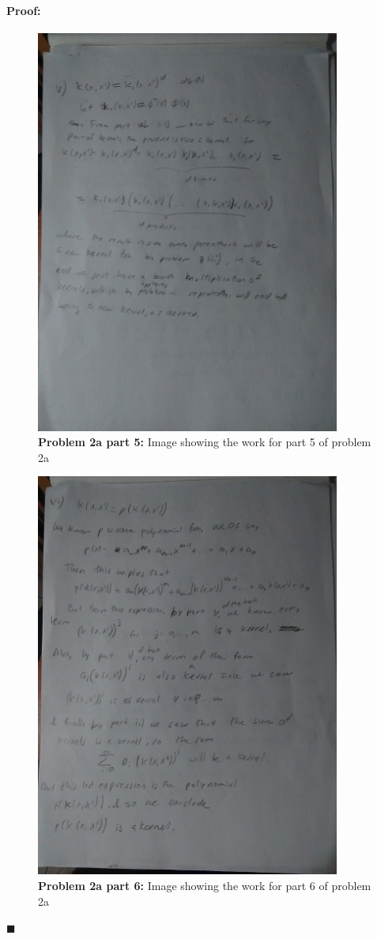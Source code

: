 \documentclass[12pt]{article}
\newenvironment{proof}{\paragraph{Proof: }}{\hfill$\blacksquare$}
\begin{document}
\begin{proof}
\begin{figure}[!htbp]
\centering
\includegraphics[width=10cm]{hw3_prob2a_5.jpg}
\caption{\textbf{Problem 2a part 5:} Image showing the work for part 5 of problem 2a}
\end{figure}

\begin{figure}[!htbp]
\centering
\includegraphics[width=10cm]{hw3_prob2a_6.jpg}
\caption{\textbf{Problem 2a part 6:} Image showing the work for part 6 of problem 2a}
\end{figure}


\end{proof}
\end{document}
